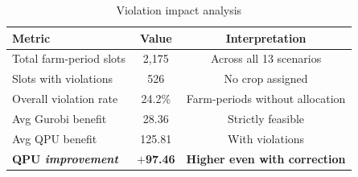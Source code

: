 \begin{table}[H]
\centering
\caption{Violation impact analysis}
\label{tab:violation_impact}
\small
\begin{tabular}{lcc}
\toprule
\textbf{Metric} & \textbf{Value} & \textbf{Interpretation} \\
\midrule
Total farm-period slots & 2,175 & Across all 13 scenarios \\
Slots with violations & 526 & No crop assigned \\
Overall violation rate & 24.2\% & Farm-periods without allocation \\
\midrule
Avg Gurobi benefit & 28.36 & Strictly feasible \\
Avg QPU benefit & 125.81 & With violations \\
\textbf{QPU \textit{improvement}} & \textbf{$+$97.46} & \textbf{Higher even with correction} \\
\bottomrule
\end{tabular}
\end{table}




